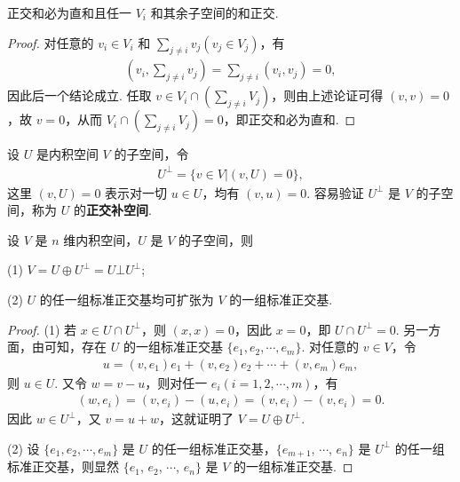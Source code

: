 \documentclass[../../main.tex]{subfiles}%
\begin{document}
\begin{lemma}\label{lemma:正交和必为直和}
正交和必为直和且任一 $V_i$ 和其余子空间的和正交.
\end{lemma}
\begin{proof}

对任意的 $v_i \in V_i$ 和 $\sum_{j \neq i}v_j (v_j \in V_j)$，有
\begin{align*}
(v_i, \sum_{j \neq i}v_j) = \sum_{j \neq i}(v_i, v_j) = 0,
\end{align*}
因此后一个结论成立. 任取 $v \in V_i \cap (\sum_{j \neq i}V_j)$，则由上述论证可得 $(v, v) = 0$，故 $v = 0$，从而 $V_i \cap (\sum_{j \neq i}V_j) = 0$，即正交和必为直和.

\end{proof}

\begin{definition}[正交补空间]\label{definition:正交补空间}
设 $U$ 是内积空间 $V$ 的子空间，令
\begin{align*}
U^\perp = \{v \in V | (v, U) = 0\},
\end{align*}
这里 $(v, U) = 0$ 表示对一切 $u \in U$，均有 $(v, u) = 0$. 容易验证 $U^\perp$ 是 $V$ 的子空间，称为 $U$ 的\textbf{正交补空间}.
\end{definition}

\begin{theorem}
设 $V$ 是 $n$ 维内积空间，$U$ 是 $V$ 的子空间，则

(1) $V = U \oplus U^\perp=U\bot U^{\bot}$;

(2) $U$ 的任一组标准正交基均可扩张为 $V$ 的一组标准正交基.
\end{theorem}
\begin{proof}

(1) 若 $x \in U \cap U^\perp$，则 $(x, x) = 0$，因此 $x = 0$，即 $U \cap U^\perp = 0$. 另一方面，由可知，存在 $U$ 的一组标准正交基 $\{e_1, e_2, \cdots, e_m\}$. 对任意的 $v \in V$，令
\begin{align*}
u = (v, e_1)e_1 + (v, e_2)e_2 + \cdots + (v, e_m)e_m,
\end{align*}
则 $u \in U$. 又令 $w = v - u$，则对任一 $e_i (i = 1, 2, \cdots, m)$，有
\begin{align*}
(w, e_i) = (v, e_i) - (u, e_i) = (v, e_i) - (v, e_i) = 0.
\end{align*}
因此 $w \in U^\perp$，又 $v = u + w$，这就证明了 $V = U \oplus U^\perp$.

(2) 设 $\{e_1, e_2, \cdots, e_m\}$ 是 $U$ 的任一组标准正交基，$\{e_{m + 1}$, $\cdots$, $e_n\}$ 是 $U^\perp$ 的任一组标准正交基，则显然 $\{e_1$, $e_2$, $\cdots$, $e_n\}$ 是 $V$ 的一组标准正交基. 

\end{proof}
\end{document}
